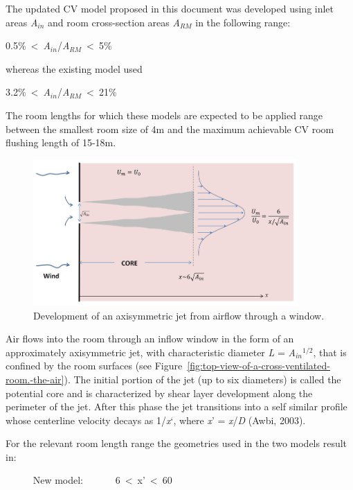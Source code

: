 The updated CV model proposed in this document was developed using inlet areas \emph{A}\(_{in}\) and room cross-section areas \emph{A}\(_{RM}\) in the following range:

0.5\%~\textless{}~\emph{A}\(_{in}\)/\emph{A}\(_{RM}\)~\textless{}~5\%

whereas the existing model used

3.2\%~\textless{}~\emph{A}\(_{in}\)/\emph{A}\(_{RM}\)~\textless{}~21\%

The room lengths for which these models are expected to be applied range between the smallest room size of 4m and the maximum achievable CV room flushing length of 15-18m.

\begin{figure}[hbtp] %
\centering
\includegraphics[width=0.9\textwidth, height=0.9\textheight, keepaspectratio=true]{media/image2622.png}
\caption{Development of an axisymmetric jet from airflow through a window. \protect \label{fig:development-of-an-axisymmetric-jet-from}}
\end{figure}

Air flows into the room through an inflow window in the form of an approximately axisymmetric jet, with characteristic diameter \emph{L} = \emph{A}\(_{in}\)\(^{1/2}\), that is confined by the room surfaces (see Figure~\ref{fig:top-view-of-a-cross-ventilated-room.-the-air}). The initial portion of the jet (up to six diameters) is called the potential core and is characterized by shear layer development along the perimeter of the jet. After this phase the jet transitions into a self similar profile whose centerline velocity decays as 1/\emph{x}`, where \emph{x}' = \emph{x}/\emph{D} (Awbi, 2003).

For the relevant room length range the geometries used in the two models result in:

~~~~~ New model:~~~~~~ 6~\textless{}~x'~\textless{}~60

